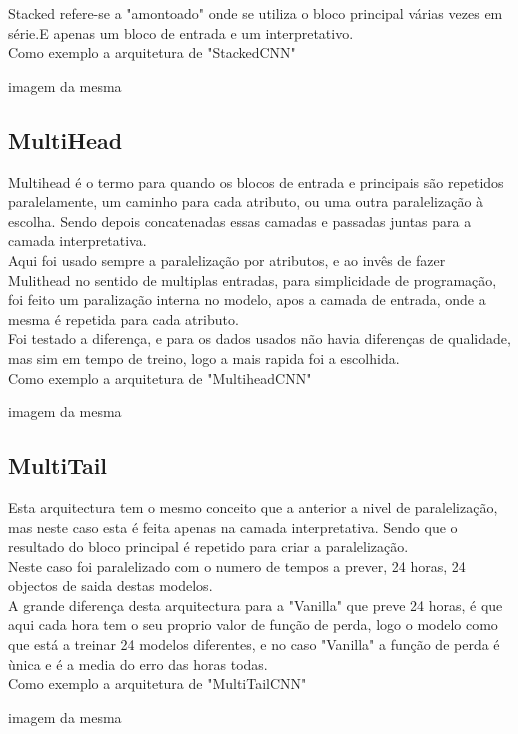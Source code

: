 Stacked refere-se a "amontoado" onde se utiliza o bloco principal várias vezes em série.E apenas um bloco de  entrada e um interpretativo. \\
Como exemplo a arquitetura de "StackedCNN"

imagem da mesma

\subsection{MultiHead\label{se:multihea}}

Multihead é o termo para quando os blocos de entrada e principais são repetidos paralelamente, um caminho para cada atributo, ou uma outra paralelização à escolha. Sendo depois concatenadas essas camadas e passadas juntas para a camada interpretativa. \\
Aqui foi usado sempre a paralelização por atributos, e ao invês de fazer Mulithead no sentido de multiplas entradas, para simplicidade de programação, foi feito um paralização interna no modelo, apos a camada de entrada, onde a mesma é repetida para cada atributo. \\
Foi testado a diferença, e para os dados usados não havia diferenças de qualidade, mas sim em tempo de treino, logo a mais rapida foi a escolhida. \\
Como exemplo a arquitetura de "MultiheadCNN"

imagem da mesma

\subsection{MultiTail\label{se:multitail}}

Esta arquitectura tem o mesmo conceito que a anterior a nivel de paralelização, mas neste caso esta é feita apenas na camada interpretativa. Sendo que o resultado do bloco principal é repetido para criar a paralelização. \\
Neste caso foi paralelizado com o numero de tempos a prever, 24 horas, 24 objectos de saida destas modelos.  \\
A grande diferença desta arquitectura para a "Vanilla" que preve 24 horas, é que aqui cada hora tem o seu proprio valor de função de perda, logo o modelo como que está a treinar 24 modelos diferentes, e no caso "Vanilla" a função de perda é ùnica e é a media do erro das horas todas. \\
Como exemplo a arquitetura de "MultiTailCNN"

imagem da mesma

